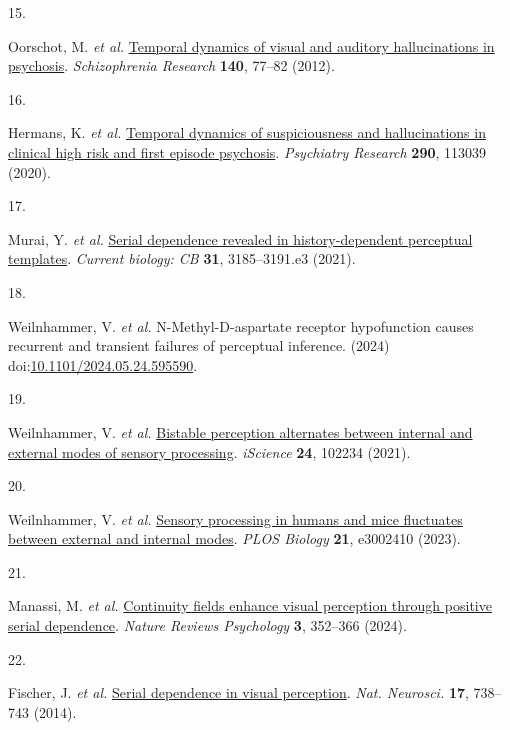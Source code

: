 \documentclass[
]{article}
\newlength{\cslhangindent}
\newlength{\csllabelwidth}
\newlength{\cslentryspacingunit} %
\newenvironment{CSLReferences}[2] %
 {%
  \setlength{\parindent}{0pt}
  \ifodd #1
  \let\oldpar\par
  \def\par{\hangindent=\cslhangindent\oldpar}
  \fi
  \setlength{\parskip}{#2\cslentryspacingunit}
 }%
 {}
\newcommand{\CSLLeftMargin}[1]{\parbox[t]{\csllabelwidth}{#1}}
\newcommand{\CSLRightInline}[1]{\parbox[t]{\linewidth - \csllabelwidth}{#1}\break}
\begin{document}
\begin{CSLReferences}{0}{0}
\leavevmode{}%
\CSLLeftMargin{15. }%
\CSLRightInline{Oorschot, M. \emph{et al.}
\href{https://doi.org/10.1016/j.schres.2012.06.010}{Temporal dynamics of
visual and auditory hallucinations in psychosis}. \emph{Schizophrenia
Research} \textbf{140}, 77--82 (2012).}

\leavevmode{}%
\CSLLeftMargin{16. }%
\CSLRightInline{Hermans, K. \emph{et al.}
\href{https://doi.org/10.1016/j.psychres.2020.113039}{Temporal dynamics
of suspiciousness and hallucinations in clinical high risk and first
episode psychosis}. \emph{Psychiatry Research} \textbf{290}, 113039
(2020).}

\leavevmode{}%
\CSLLeftMargin{17. }%
\CSLRightInline{Murai, Y. \emph{et al.}
\href{https://doi.org/10.1016/j.cub.2021.05.006}{Serial dependence
revealed in history-dependent perceptual templates}. \emph{Current
biology: CB} \textbf{31}, 3185--3191.e3 (2021).}

\leavevmode{}%
\CSLLeftMargin{18. }%
\CSLRightInline{Weilnhammer, V. \emph{et al.} N-{Methyl}-{D}-aspartate
receptor hypofunction causes recurrent and transient failures of
perceptual inference. (2024)
doi:\href{https://doi.org/10.1101/2024.05.24.595590}{10.1101/2024.05.24.595590}.}

\leavevmode{}%
\CSLLeftMargin{19. }%
\CSLRightInline{Weilnhammer, V. \emph{et al.}
\href{https://doi.org/10.1016/j.isci.2021.102234}{Bistable perception
alternates between internal and external modes of sensory processing}.
\emph{iScience} \textbf{24}, 102234 (2021).}

\leavevmode{}%
\CSLLeftMargin{20. }%
\CSLRightInline{Weilnhammer, V. \emph{et al.}
\href{https://doi.org/10.1371/journal.pbio.3002410}{Sensory processing
in humans and mice fluctuates between external and internal modes}.
\emph{PLOS Biology} \textbf{21}, e3002410 (2023).}

\leavevmode{}%
\CSLLeftMargin{21. }%
\CSLRightInline{Manassi, M. \emph{et al.}
\href{https://doi.org/10.1038/s44159-024-00297-x}{Continuity fields
enhance visual perception through positive serial dependence}.
\emph{Nature Reviews Psychology} \textbf{3}, 352--366 (2024).}

\leavevmode{}%
\CSLLeftMargin{22. }%
\CSLRightInline{Fischer, J. \emph{et al.}
\href{https://doi.org/10.1038/nn.3689}{Serial dependence in visual
perception}. \emph{Nat. Neurosci.} \textbf{17}, 738--743 (2014).}


\end{CSLReferences}
\end{document}
